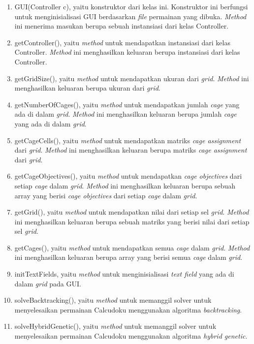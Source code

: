 \begin{enumerate}
\item GUI(Controller c), yaitu konstruktor dari kelas ini. Konstruktor ini berfungsi untuk menginisialisasi GUI berdasarkan \textit{file} permainan yang dibuka. \textit{Method} ini menerima masukan berupa sebuah instansiasi dari kelas Controller.
\item getController(), yaitu \textit{method} untuk mendapatkan instansiasi dari kelas Controller. \textit{Method} ini menghasilkan keluaran berupa instansiasi dari kelas Controller.
\item getGridSize(), yaitu \textit{method} untuk mendapatkan ukuran dari \textit{grid}. \textit{Method} ini menghasilkan keluaran berupa ukuran dari \textit{grid}.
\item getNumberOfCages(), yaitu \textit{method} untuk mendapatkan jumlah \textit{cage} yang ada di dalam \textit{grid}. \textit{Method} ini menghasilkan keluaran berupa jumlah \textit{cage} yang ada di dalam \textit{grid}.
\item getCageCells(), yaitu \textit{method} untuk mendapatkan matriks \textit{cage assignment} dari \textit{grid}. \textit{Method} ini menghasilkan keluaran berupa matriks \textit{cage assignment} dari \textit{grid}.
\item getCageObjectives(), yaitu \textit{method} untuk mendapatkan \textit{cage objectives} dari setiap \textit{cage} dalam \textit{grid}. \textit{Method} ini menghasilkan keluaran berupa sebuah array yang berisi \textit{cage objectives} dari setiap \textit{cage} dalam \textit{grid}.
\item getGrid(), yaitu \textit{method} untuk mendapatkan nilai dari setiap sel \textit{grid}. \textit{Method} ini menghasilkan keluaran berupa sebuah matriks yang berisi nilai dari setiap sel \textit{grid}.
\item getCages(), yaitu \textit{method} untuk mendapatkan semua \textit{cage} dalam \textit{grid}. \textit{Method} ini menghasilkan keluaran berupa array yang berisi semua \textit{cage} dalam \textit{grid}.
\item initTextFields, yaitu \textit{method} untuk menginisialisasi \textit{text field} yang ada di dalam \textit{grid} pada GUI.
\item solveBacktracking(), yaitu \textit{method} untuk memanggil solver untuk menyelesaikan permainan Calcudoku menggunakan algoritma \textit{backtracking}. 
\item solveHybridGenetic(), yaitu \textit{method} untuk memanggil solver untuk menyelesaikan permainan Calcudoku menggunakan algoritma \textit{hybrid genetic}.

\end{enumerate}
